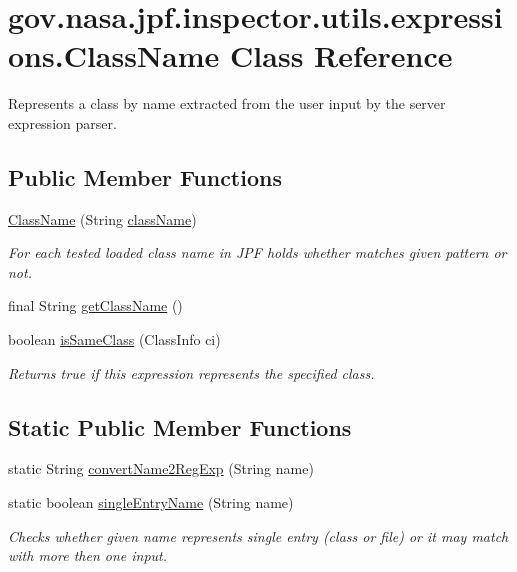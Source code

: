 \hypertarget{classgov_1_1nasa_1_1jpf_1_1inspector_1_1utils_1_1expressions_1_1_class_name}{}\section{gov.\+nasa.\+jpf.\+inspector.\+utils.\+expressions.\+Class\+Name Class Reference}
\label{classgov_1_1nasa_1_1jpf_1_1inspector_1_1utils_1_1expressions_1_1_class_name}


Represents a class by name extracted from the user input by the server expression parser.  


\subsection*{Public Member Functions}
\begin{DoxyCompactItemize}
\item 
\hyperlink{classgov_1_1nasa_1_1jpf_1_1inspector_1_1utils_1_1expressions_1_1_class_name_aea0892ef2da7ab653db00fc41fa882a8}{Class\+Name} (String \hyperlink{classgov_1_1nasa_1_1jpf_1_1inspector_1_1utils_1_1expressions_1_1_class_name_a9913d2709a2450faa2937fc63b3ee977}{class\+Name})
\begin{DoxyCompactList}\small\item\em For each tested loaded class name in J\+PF holds whether matches given pattern or not. \end{DoxyCompactList}\item 
final String \hyperlink{classgov_1_1nasa_1_1jpf_1_1inspector_1_1utils_1_1expressions_1_1_class_name_a4953615ac3b331dac220f0ab4a817095}{get\+Class\+Name} ()
\item 
boolean \hyperlink{classgov_1_1nasa_1_1jpf_1_1inspector_1_1utils_1_1expressions_1_1_class_name_aacf2908382288e215d6fb63093a63b30}{is\+Same\+Class} (Class\+Info ci)
\begin{DoxyCompactList}\small\item\em Returns true if this expression represents the specified class. \end{DoxyCompactList}\end{DoxyCompactItemize}
\subsection*{Static Public Member Functions}
\begin{DoxyCompactItemize}
\item 
static String \hyperlink{classgov_1_1nasa_1_1jpf_1_1inspector_1_1utils_1_1expressions_1_1_class_name_a191c08d3424854ebb7418f7e65ad1712}{convert\+Name2\+Reg\+Exp} (String name)
\item 
static boolean \hyperlink{classgov_1_1nasa_1_1jpf_1_1inspector_1_1utils_1_1expressions_1_1_class_name_ac619eeea225a97445cc25a7a05ca7e49}{single\+Entry\+Name} (String name)
\begin{DoxyCompactList}\small\item\em Checks whether given name represents single entry (class or file) or it may match with more then one input. \end{DoxyCompactList}\end{DoxyCompactItemize}
